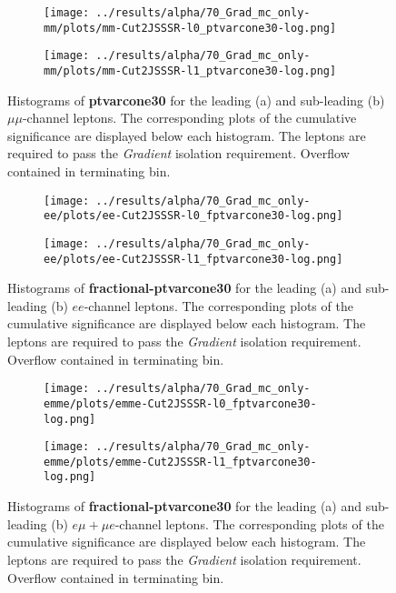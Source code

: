 \begin{figure}
\centering
\begin{subfigure}{.65\textwidth}
  \centering
  \texttt{[image: ../results/alpha/70\_Grad\_mc\_only-mm/plots/mm-Cut2JSSSR-l0\_ptvarcone30-log.png]}
  \caption{}
  \label{mm_leading_topoetcone}
\end{subfigure}
\begin{subfigure}{.65\textwidth}
 \centering
  \texttt{[image: ../results/alpha/70\_Grad\_mc\_only-mm/plots/mm-Cut2JSSSR-l1\_ptvarcone30-log.png]}
  \caption{}
  \label{mm_subleading_topoetcone}
\end{subfigure}
\caption{Histograms of \textbf{ptvarcone30} for the leading (a) and sub-leading (b) $\mu\mu$-channel leptons. The corresponding plots of the cumulative significance are displayed below each histogram. The leptons are required to pass the \textit{Gradient} isolation requirement. Overflow contained in terminating bin.}
\label{ptvarcone30_isoplots_wGrad_mm}
\end{figure}
\begin{figure}
\centering
\begin{subfigure}{.65\textwidth}
  \centering
  \texttt{[image: ../results/alpha/70\_Grad\_mc\_only-ee/plots/ee-Cut2JSSSR-l0\_fptvarcone30-log.png]}
  \caption{}
  \label{ee_leading_topoetcone}
\end{subfigure}
\begin{subfigure}{.65\textwidth}
 \centering
  \texttt{[image: ../results/alpha/70\_Grad\_mc\_only-ee/plots/ee-Cut2JSSSR-l1\_fptvarcone30-log.png]}
  \caption{}
  \label{ee_subleading_topoetcone}
\end{subfigure}
\caption{Histograms of \textbf{fractional-ptvarcone30} for the leading (a) and sub-leading (b) $ee$-channel leptons. The corresponding plots of the cumulative significance are displayed below each histogram. The leptons are required to pass the \textit{Gradient} isolation requirement. Overflow contained in terminating bin.}
\label{fptvarcone30_isoplots_wGrad_ee}
\end{figure}
\begin{figure}
\centering
\begin{subfigure}{.65\textwidth}
  \centering
 \texttt{[image: ../results/alpha/70\_Grad\_mc\_only-emme/plots/emme-Cut2JSSSR-l0\_fptvarcone30-log.png]}
 \caption{}
  \label{emme_leading_topoetcone}
\end{subfigure}
\begin{subfigure}{.65\textwidth}
 \centering
  \texttt{[image: ../results/alpha/70\_Grad\_mc\_only-emme/plots/emme-Cut2JSSSR-l1\_fptvarcone30-log.png]}
  \caption{}
  \label{emme_subleading_topoetcone}
\end{subfigure}
\caption{Histograms of \textbf{fractional-ptvarcone30} for the leading (a) and sub-leading (b) $e\mu+\mu e$-channel leptons. The corresponding plots of the cumulative significance are displayed below each histogram. The leptons are required to pass the \textit{Gradient} isolation requirement. Overflow contained in terminating bin.}
\label{fptvarcone30_isoplots_wGrad_emme}
\end{figure}
